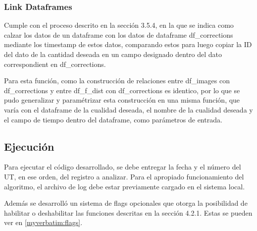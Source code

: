 \subsubsection{Link Dataframes}
Cumple con el proceso descrito en la sección 3.5.4, en la que se indica como calzar los datos de un dataframe con los datos de dataframe df\_corrections mediante los timestamp de estos datos, comparando estos para luego copiar la ID del dato de la cantidad deseada en un campo designado dentro del dato correspondient en df\_corrections.

Para esta función, como la construcción de relaciones entre df\_images con df\_corrections y entre df\_f\_dist con df\_corrections es identico, por lo que se pudo generalizar y paramétrizar esta construcción en una misma función, que varía con el dataframe de la cualidad deseada, el nombre de la cualidad deseada y el campo de tiempo dentro del dataframe, como parámetros de entrada.

\subsection{Ejecución}

Para ejecutar el código desarrollado, se debe entregar la fecha y el número del UT, en ese orden, del registro a analizar. Para el apropiado funcionamiento del algoritmo, el archivo de log debe estar previamente cargado en el sistema local.

Además se desarrolló un sistema de flags opcionales que otorga la posibilidad de habilitar o deshabilitar las funciones descritas en la sección 4.2.1. Estas se pueden ver en \ref{myverbatim:flags}.

